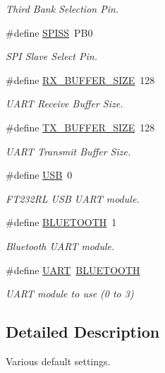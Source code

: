 \begin{DoxyCompactItemize}
\begin{DoxyCompactList}\small\item\em Third Bank Selection Pin. \end{DoxyCompactList}\item 
\#define \hyperlink{group__config_gab652052c0495e4b720b52cdcf83f535d}{S\-P\-I\-S\-S}~P\-B0
\begin{DoxyCompactList}\small\item\em S\-P\-I Slave Select Pin. \end{DoxyCompactList}\item 
\#define \hyperlink{group__config_ga739a2a1a0047c98ac1b18ecd25dac092}{R\-X\-\_\-\-B\-U\-F\-F\-E\-R\-\_\-\-S\-I\-Z\-E}~128
\begin{DoxyCompactList}\small\item\em U\-A\-R\-T Receive Buffer Size. \end{DoxyCompactList}\item 
\#define \hyperlink{group__config_ga9ab33647617098646990fe263600b650}{T\-X\-\_\-\-B\-U\-F\-F\-E\-R\-\_\-\-S\-I\-Z\-E}~128
\begin{DoxyCompactList}\small\item\em U\-A\-R\-T Transmit Buffer Size. \end{DoxyCompactList}\item 
\#define \hyperlink{group__config_ga779bf099075a999d1074357fccbd466b}{U\-S\-B}~0
\begin{DoxyCompactList}\small\item\em F\-T232\-R\-L U\-S\-B U\-A\-R\-T module. \end{DoxyCompactList}\item 
\#define \hyperlink{group__config_ga3f30897fa8435dc9811642367a328be8}{B\-L\-U\-E\-T\-O\-O\-T\-H}~1
\begin{DoxyCompactList}\small\item\em Bluetooth U\-A\-R\-T module. \end{DoxyCompactList}\item 
\#define \hyperlink{group__config_gaf7cb12b462b4594bd759d1b4e241ec4c}{U\-A\-R\-T}~\hyperlink{group__config_ga3f30897fa8435dc9811642367a328be8}{B\-L\-U\-E\-T\-O\-O\-T\-H}
\begin{DoxyCompactList}\small\item\em U\-A\-R\-T module to use (0 to 3) \end{DoxyCompactList}\end{DoxyCompactItemize}


\subsection{Detailed Description}
Various default settings. 

